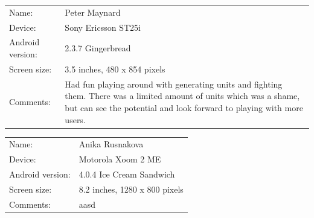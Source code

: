\renewcommand{\arraystretch}{1.5}
\begin{tabular}{l  p{11cm}}
	\hline
	Name: & Peter Maynard \\
	\hdashline
	Device: & Sony Ericsson ST25i \\
	\hdashline
	Android version: & 2.3.7 Gingerbread \\
	\hdashline
	Screen size: & 3.5 inches, 480 x 854 pixels \\
	\hdashline
	Comments: & Had fun playing around with generating units and fighting them. There was a limited amount of units which was a shame, but can see the potential and look forward to playing with more users. \\
	\hline
\end{tabular}

\begin{tabular}{l  p{11cm}}
	\hline
	Name: & Anika Rusnakova \\
	\hdashline
	Device: & Motorola Xoom 2 ME \\
	\hdashline
	Android version: & 4.0.4 Ice Cream Sandwich \\
	\hdashline
	Screen size: & 8.2 inches, 1280 x 800 pixels \\
	\hdashline
	Comments: & aasd \\
	\hline
\end{tabular}